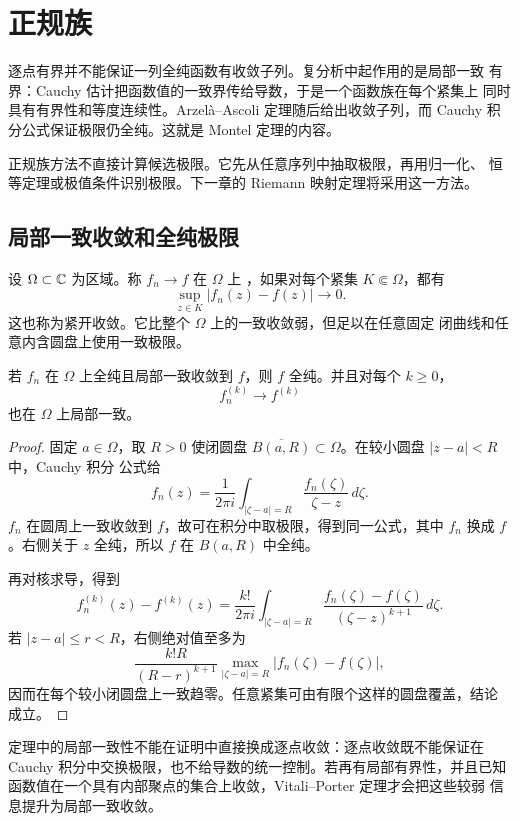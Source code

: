 \chapter{正规族}
\label{chap:normal-families}

逐点有界并不能保证一列全纯函数有收敛子列。复分析中起作用的是局部一致
有界：Cauchy 估计把函数值的一致界传给导数，于是一个函数族在每个紧集上
同时具有有界性和等度连续性。Arzel\`a--Ascoli 定理随后给出收敛子列，而
Cauchy 积分公式保证极限仍全纯。这就是 Montel 定理的内容。

正规族方法不直接计算候选极限。它先从任意序列中抽取极限，再用归一化、
恒等定理或极值条件识别极限。下一章的 Riemann 映射定理将采用这一方法。

\section{局部一致收敛和全纯极限}

设 $\Omega\subset\mathbb{C}$ 为区域。称 $f_n\to f$ 在 $\Omega$ 上
，如果对每个紧集 $K\Subset\Omega$，都有
\[
 \sup_{z\in K}|f_n(z)-f(z)|\longrightarrow0.
\]
这也称为紧开收敛。它比整个 $\Omega$ 上的一致收敛弱，但足以在任意固定
闭曲线和任意内含圆盘上使用一致极限。

\begin{theorem}\label{thm:holomorphic-local-uniform-limit}
若 $f_n$ 在 $\Omega$ 上全纯且局部一致收敛到 $f$，则 $f$ 全纯。并且对每个
$k\ge0$，
\[
 f_n^{(k)}\longrightarrow f^{(k)}
\]
也在 $\Omega$ 上局部一致。
\end{theorem}

\begin{proof}
固定 $a\in\Omega$，取 $R>0$ 使闭圆盘
$\overline{B(a,R)}\subset\Omega$。在较小圆盘 $|z-a|<R$ 中，Cauchy 积分
公式给
\[
 f_n(z)=\frac{1}{2\pi i}\int_{|\zeta-a|=R}
 \frac{f_n(\zeta)}{\zeta-z}\,d\zeta.
\]
$f_n$ 在圆周上一致收敛到 $f$，故可在积分中取极限，得到同一公式，其中
$f_n$ 换成 $f$。右侧关于 $z$ 全纯，所以 $f$ 在 $B(a,R)$ 中全纯。

再对核求导，得到
\[
 f_n^{(k)}(z)-f^{(k)}(z)
 =\frac{k!}{2\pi i}\int_{|\zeta-a|=R}
 \frac{f_n(\zeta)-f(\zeta)}{(\zeta-z)^{k+1}}\,d\zeta.
\]
若 $|z-a|\le r<R$，右侧绝对值至多为
\[
 \frac{k!R}{(R-r)^{k+1}}
 \max_{|\zeta-a|=R}|f_n(\zeta)-f(\zeta)|,
\]
因而在每个较小闭圆盘上一致趋零。任意紧集可由有限个这样的圆盘覆盖，结论
成立。
\end{proof}

定理中的局部一致性不能在证明中直接换成逐点收敛：逐点收敛既不能保证在
Cauchy 积分中交换极限，也不给导数的统一控制。若再有局部有界性，并且已知
函数值在一个具有内部聚点的集合上收敛，Vitali--Porter 定理才会把这些较弱
信息提升为局部一致收敛。

